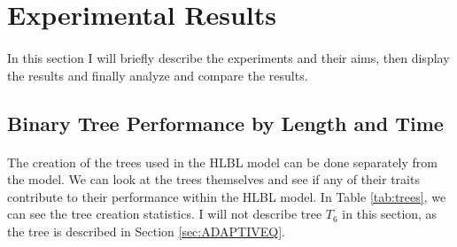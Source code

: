 \section{Experimental Results}
\paragraph{}
In this section I will briefly describe the experiments and their aims, then display the results and finally analyze and compare the results.

\subsection{Binary Tree Performance by Length and Time}
\paragraph{}
The creation of the trees used in the HLBL model can be done separately from the model. We can look at the trees themselves and see if any of their traits contribute to their performance within the HLBL model.  In Table \ref{tab:trees}, we can see the tree creation statistics. I will not describe tree $T_6$ in this section, as the tree is described in Section \ref{sec:ADAPTIVEQ}.
 
